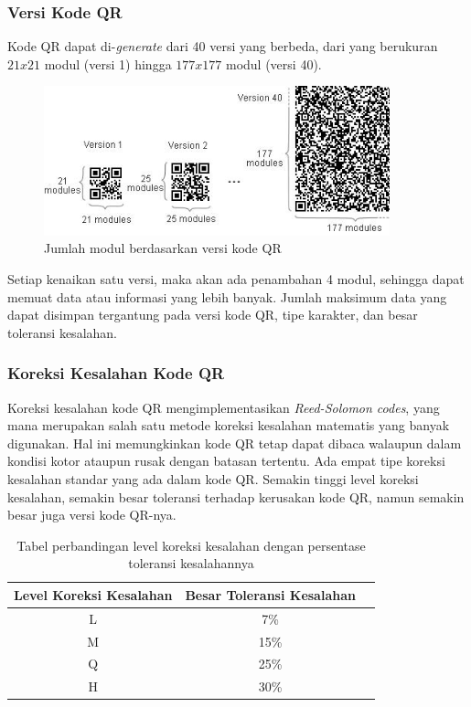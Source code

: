 \subsubsection{Versi Kode QR}
Kode QR dapat di-\emph{generate} dari 40 versi yang berbeda, dari yang berukuran $21x21$ modul (versi 1) hingga $177x177$ modul (versi 40).

\begin{figure}[h]
	\centering
	\includegraphics[width=10cm]{contents/chapter-2/2-versiqr.jpg}
	\caption{Jumlah modul berdasarkan versi kode QR}
	\label{Fig: 2-versiqr}
\end{figure}

Setiap kenaikan satu versi, maka akan ada penambahan 4 modul, sehingga dapat memuat data atau informasi yang lebih banyak. Jumlah maksimum data yang dapat
disimpan tergantung pada versi kode QR, tipe karakter, dan besar toleransi kesalahan.

\subsubsection{Koreksi Kesalahan Kode QR}
Koreksi kesalahan kode QR mengimplementasikan \emph{Reed-Solomon codes}, yang mana merupakan salah satu metode koreksi kesalahan matematis yang banyak
digunakan. Hal ini memungkinkan kode QR tetap dapat dibaca walaupun dalam kondisi kotor ataupun rusak dengan batasan tertentu. Ada empat tipe koreksi kesalahan
standar yang ada dalam kode QR. Semakin tinggi level koreksi kesalahan, semakin besar toleransi terhadap kerusakan kode QR, namun semakin besar juga versi kode
QR-nya.

\begin{table}[h]
	\caption{Tabel perbandingan level koreksi kesalahan dengan persentase toleransi kesalahannya}
	\vspace{0.5em}
	\centering
	\begin{tabular}{|c|c|c|}
		\hline
		Level Koreksi Kesalahan & Besar Toleransi Kesalahan \\
		\hline
		L                       & 7\%                       \\
		M                       & 15\%                      \\
		Q                       & 25\%                      \\
		H                       & 30\%                      \\ \hline
	\end{tabular}
	\label{Tab: 2-tabelperbandinganlevelkoreksi}
\end{table}

